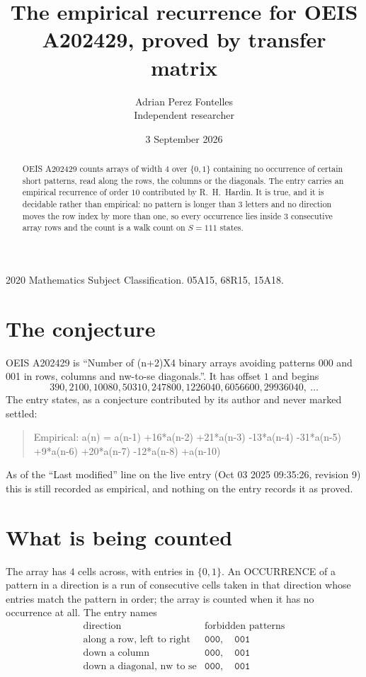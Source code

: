 \documentclass[11pt,a4paper]{article}
\title{The empirical recurrence for OEIS A202429, proved by transfer matrix}
\author{Adrian Perez Fontelles\\ \small Independent researcher}
\date{3 September 2026}
\theoremstyle{plain}
\theoremstyle{definition}
\begin{document}
\maketitle

\begin{abstract}
OEIS A202429 counts arrays of width $4$ over $\{0,1\}$ containing no occurrence of certain short
patterns, read along the rows, the columns or the diagonals. The entry carries an empirical
recurrence of order $10$ contributed by R.~H.~Hardin. It is true, and it is decidable
rather than empirical: no pattern is longer than $3$ letters and no direction moves the row
index by more than one, so every occurrence lies inside $3$ consecutive array rows and the
count is a walk count on $S=111$ states.
\end{abstract}

\noindent\small 2020 Mathematics Subject Classification. 05A15, 68R15, 15A18.\normalsize

\section{The conjecture}

OEIS A202429 is ``Number of (n+2)X4 binary arrays avoiding patterns 000 and 001 in rows, columns and nw-to-se diagonals.''. It has offset $1$ and begins
\[
390, 2100, 10080, 50310, 247800, 1226040, 6056600, 29936040,\ \dots
\]
The entry states, as a conjecture contributed by its author and never marked settled:
\begin{quote}
Empirical: a(n) = a(n-1) +16*a(n-2) +21*a(n-3) -13*a(n-4) -31*a(n-5) +9*a(n-6) +20*a(n-7) -12*a(n-8) +a(n-10)
\end{quote}
As of the ``Last modified'' line on the live entry (Oct 03 2025 09:35:26, revision 9) this is still
recorded as empirical, and nothing on the entry records it as proved.

\section{What is being counted}

The array has $4$ cells across, with entries in $\{0,1\}$. An OCCURRENCE of a pattern in a
direction is a run of consecutive cells taken in that direction whose entries match the pattern
in order; the array is counted when it has no occurrence at all. The entry names
\[
\begin{array}{ll}
\text{direction} & \text{forbidden patterns} \\[2pt]
\text{along a row, left to right} & \mathtt{000},\quad \mathtt{001} \\
\text{down a column} & \mathtt{000},\quad \mathtt{001} \\
\text{down a diagonal, nw to se} & \mathtt{000},\quad \mathtt{001} \\
\end{array}
\]
\end{document}
